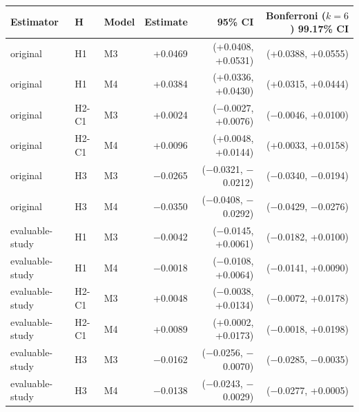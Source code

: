 \begin{tabular}{lllrrr}
\toprule
Estimator & H & Model & Estimate & 95\% CI & Bonferroni ($k=6$) 99.17\% CI\\
\midrule
original & H1 & M3 & +0.0469 & (+0.0408, +0.0531) & (+0.0388, +0.0555)\\
original & H1 & M4 & +0.0384 & (+0.0336, +0.0430) & (+0.0315, +0.0444)\\
original & H2-C1 & M3 & +0.0024 & ($-$0.0027, +0.0076) & ($-$0.0046, +0.0100)\\
original & H2-C1 & M4 & +0.0096 & (+0.0048, +0.0144) & (+0.0033, +0.0158)\\
original & H3 & M3 & $-$0.0265 & ($-$0.0321, $-$0.0212) & ($-$0.0340, $-$0.0194)\\
original & H3 & M4 & $-$0.0350 & ($-$0.0408, $-$0.0292) & ($-$0.0429, $-$0.0276)\\
\addlinespace
evaluable-study & H1 & M3 & $-$0.0042 & ($-$0.0145, +0.0061) & ($-$0.0182, +0.0100)\\
evaluable-study & H1 & M4 & $-$0.0018 & ($-$0.0108, +0.0064) & ($-$0.0141, +0.0090)\\
evaluable-study & H2-C1 & M3 & +0.0048 & ($-$0.0038, +0.0134) & ($-$0.0072, +0.0178)\\
evaluable-study & H2-C1 & M4 & +0.0089 & (+0.0002, +0.0173) & ($-$0.0018, +0.0198)\\
evaluable-study & H3 & M3 & $-$0.0162 & ($-$0.0256, $-$0.0070) & ($-$0.0285, $-$0.0035)\\
evaluable-study & H3 & M4 & $-$0.0138 & ($-$0.0243, $-$0.0029) & ($-$0.0277, +0.0005)\\
\bottomrule
\end{tabular}
